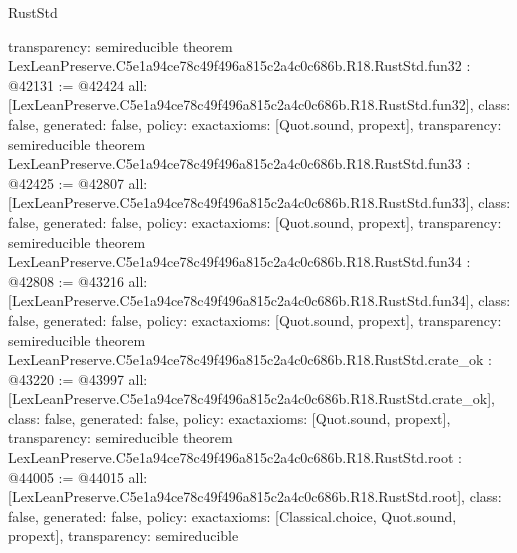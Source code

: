 \begin{lexlean}{RustStd}
\begin{coremodule}
{  transparency: semireducible
}
theorem LexLeanPreserve.C5e1a94ce78c49f496a815c2a4c0c686b.R18.RustStd.fun32 : @42131 := @42424 {
  all: [LexLeanPreserve.C5e1a94ce78c49f496a815c2a4c0c686b.R18.RustStd.fun32],
  class: false,
  generated: false,
  policy: exact{axioms: [Quot.sound, propext]},
  transparency: semireducible
}
theorem LexLeanPreserve.C5e1a94ce78c49f496a815c2a4c0c686b.R18.RustStd.fun33 : @42425 := @42807 {
  all: [LexLeanPreserve.C5e1a94ce78c49f496a815c2a4c0c686b.R18.RustStd.fun33],
  class: false,
  generated: false,
  policy: exact{axioms: [Quot.sound, propext]},
  transparency: semireducible
}
theorem LexLeanPreserve.C5e1a94ce78c49f496a815c2a4c0c686b.R18.RustStd.fun34 : @42808 := @43216 {
  all: [LexLeanPreserve.C5e1a94ce78c49f496a815c2a4c0c686b.R18.RustStd.fun34],
  class: false,
  generated: false,
  policy: exact{axioms: [Quot.sound, propext]},
  transparency: semireducible
}
theorem LexLeanPreserve.C5e1a94ce78c49f496a815c2a4c0c686b.R18.RustStd.crate_ok : @43220 := @43997 {
  all: [LexLeanPreserve.C5e1a94ce78c49f496a815c2a4c0c686b.R18.RustStd.crate_ok],
  class: false,
  generated: false,
  policy: exact{axioms: [Quot.sound, propext]},
  transparency: semireducible
}
theorem LexLeanPreserve.C5e1a94ce78c49f496a815c2a4c0c686b.R18.RustStd.root : @44005 := @44015 {
  all: [LexLeanPreserve.C5e1a94ce78c49f496a815c2a4c0c686b.R18.RustStd.root],
  class: false,
  generated: false,
  policy: exact{axioms: [Classical.choice, Quot.sound, propext]},
  transparency: semireducible
}


\end{coremodule}
\end{lexlean}
